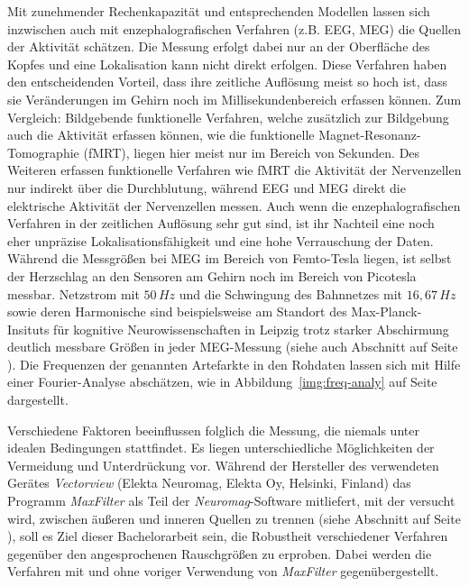 \documentclass[doc,a4paper,12pt]{apa6}
\makeatletter
\DeclareRobustCommand*{\nameref}[1]{%
      \glqq{\myorg@nameref{#1}}\grqq%
    }%
\makeatother
\begin{document}
Mit zunehmender Rechenkapazität und entsprechenden Modellen lassen sich inzwischen auch mit enzephalografischen Verfahren (z.B. EEG, MEG) die Quellen der Aktivität schätzen. Die Messung erfolgt dabei nur an der Oberfläche des Kopfes und eine Lokalisation kann nicht direkt erfolgen. Diese Verfahren haben den entscheidenden Vorteil, dass ihre zeitliche Auflösung meist so hoch ist, dass sie Veränderungen im Gehirn noch im Millisekundenbereich erfassen können. Zum Vergleich: Bildgebende funktionelle Verfahren, welche zusätzlich zur Bildgebung auch die Aktivität erfassen können, wie die funktionelle Magnet-Resonanz-Tomographie (fMRT), liegen hier meist nur im Bereich von Sekunden. Des Weiteren erfassen funktionelle Verfahren wie fMRT die Aktivität der Nervenzellen nur indirekt über die Durchblutung, während EEG und MEG direkt die elektrische Aktivität der Nervenzellen messen. Auch wenn die enzephalografischen Verfahren in der zeitlichen Auflösung sehr gut sind, ist ihr Nachteil eine noch eher unpräzise Lokalisationsfähigkeit und eine hohe Verrauschung der Daten. Während die Messgrößen bei MEG im Bereich von Femto-Tesla liegen, ist selbst der Herzschlag an den Sensoren am Gehirn noch im Bereich von Picotesla messbar. Netzstrom mit $50\,Hz$ und die Schwingung des Bahnnetzes mit $16,67\,Hz$ sowie deren Harmonische sind beispielsweise am Standort des Max-Planck-Insituts für kognitive Neurowissenschaften in Leipzig trotz starker Abschirmung deutlich messbare Größen in jeder MEG-Messung (siehe auch Abschnitt \nameref{sec:rauschen} auf Seite \pageref{sec:rauschen}). Die Frequenzen der genannten Artefarkte in den Rohdaten lassen sich mit Hilfe einer Fourier-Analyse abschätzen, wie in Abbildung~\ref{img:freq-analy} auf Seite~\pageref{img:freq-analy} dargestellt.

Verschiedene Faktoren beeinflussen folglich die Messung, die niemals unter idealen Bedingungen stattfindet. Es liegen unterschiedliche Möglichkeiten der Vermeidung und Unterdrückung vor. Während der Hersteller des verwendeten Gerätes \emph{Vectorview} (Elekta Neuromag, Elekta Oy, Helsinki, Finland) das Programm \emph{MaxFilter} als Teil der \emph{Neuromag}-Software mitliefert, mit der versucht wird, zwischen äußeren und inneren Quellen zu trennen (siehe Abschnitt \nameref{sec:maxfilter} auf Seite \pageref{sec:maxfilter}), soll es Ziel dieser Bachelorarbeit sein, die Robustheit verschiedener Verfahren gegenüber den angesprochenen Rauschgrößen zu erproben. Dabei werden die Verfahren mit und ohne voriger Verwendung von \emph{MaxFilter} gegenübergestellt.
\end{document}
